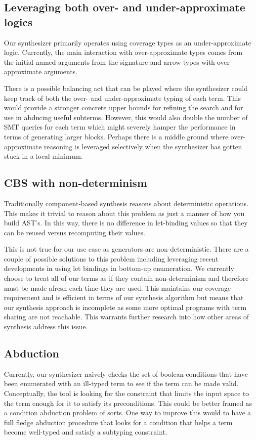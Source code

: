 \documentclass[review, sigplan]{acmart}
\begin{document}
\subsection{Leveraging both over- and under-approximate logics}
Our synthesizer primarily operates using coverage types as an under-approximate
logic. Currently, the main interaction with over-approximate types comes from the
initial named arguments from the signature and arrow types with over approximate
arguments.

There is a possible balancing act that can be played where the synthesizer could
keep track of both the over- and under-approximate typing of each term. This
would provide a stronger concrete upper bounds for refining the search and for
use in abducing useful subterms. However, this would also double the number of
SMT queries for each term which might severely hamper the performance in terms
of generating larger blocks. Perhaps there is a middle ground where
over-approximate reasoning is leveraged selectively when the synthesizer has
gotten stuck in a local minimum.

\subsection{CBS with non-determinism}
Traditionally component-based synthesis reasons about deterministic operations.
This makes it trivial to reason about this problem as just a manner of how you
build AST's. In this way, there is no difference in let-binding values so that
they can be reused versus recomputing their values.

This is not true for our use case as generators are non-deterministic. There are
a couple of possible solutions to this problem including leveraging recent
developments in using let bindings in bottom-up
enumeration\cite{li2023efficient}. We currently choose to treat all of our terms
as if they contain non-determinism and therefore must be made afresh each time
they are used. This maintains our coverage requirement and is efficient in terms
of our synthesis algorithm but means that our synthesis approach is incomplete
as some more optimal programs with term sharing are not reachable. This warrants
further research into how other areas of synthesis address this issue.

\subsection{Abduction}
Currently, our synthesizer naively checks the set of boolean conditions that
have been enumerated with an ill-typed term to see if the term can be made
valid. Conceptually, the tool is looking for the constraint that limits the
input space to the term enough for it to satisfy its preconditions. This could
be better framed as a condition abduction problem of sorts. One way to improve
this would to have a full fledge abduction procedure that looks for a condition
that helps a term become well-typed and satisfy a subtyping constraint.
\end{document}
